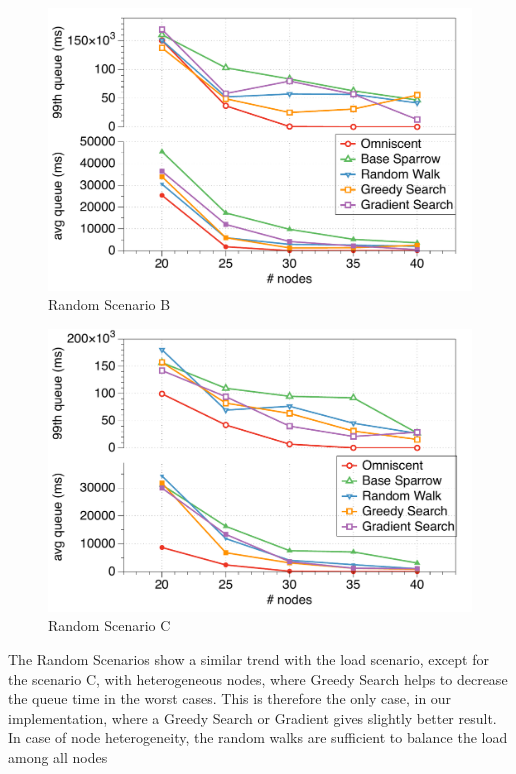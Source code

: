 \documentclass[conference]{IEEEtran}
\begin{document}
  \begin{figure}
  \begin{center}
  \includegraphics[width=.5\textwidth]{figures/randomB}
  \caption{Random Scenario B}
  \label{fig:comparison}
  \end{center}
  \end{figure}

  \begin{figure}
  \begin{center}
  \includegraphics[width=.5\textwidth]{figures/randomC}
  \caption{Random Scenario C}
  \label{fig:comparison}
  \end{center}
  \end{figure}

  The Random Scenarios show a similar trend with the load scenario, except
  for the scenario C, with heterogeneous nodes, where Greedy Search helps to
  decrease the queue time in the worst cases.  This is therefore the only
  case, in our implementation, where a Greedy Search or Gradient gives
  slightly better result. In case of node heterogeneity, the random walks
  are sufficient to balance the load among all nodes
\end{document}
